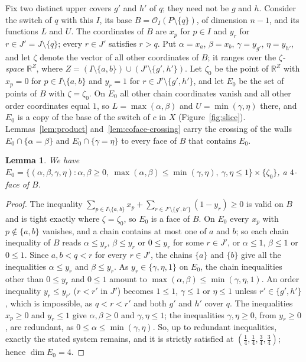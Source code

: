 \documentclass[11pt]{article}
\newtheorem{lemma}[theorem]{Lemma}
\theoremstyle{definition}
\theoremstyle{remark}
\newcommand{\OO}{\mathcal O}
\begin{document}
Fix two distinct upper covers $g'$ and $h'$ of $q$; they need not be $g$ and $h$. Consider the switch of $q$
with this $I$, its base $B=\OO_I(P\setminus\{q\})$, of dimension $n-1$,
and its functions $L$ and $U$. The coordinates of $B$ are $x_p$ for
$p\in I$ and $y_r$ for $r\in J'=J\setminus\{q\}$; every $r\in J'$
satisfies $r>q$. Put $\alpha=x_a$, $\beta=x_b$, $\gamma=y_{g'}$,
$\eta=y_{h'}$, and let $\zeta$ denote the vector of all other
coordinates of $B$; it ranges over the \emph{$\zeta$-space} $\mathbb R^Z$, where
$Z=(I\setminus\{a,b\})\cup(J'\setminus\{g',h'\})$. Let $\zeta_0$ be the point of $\mathbb R^Z$ with $x_p=0$ for
$p\in I\setminus\{a,b\}$ and $y_r=1$ for $r\in J'\setminus\{g',h'\}$,
and let $E_0$ be the set of points of $B$ with $\zeta=\zeta_0$.
On $E_0$ all other chain coordinates vanish and all other order coordinates equal $1$,
so $L=\max(\alpha,\beta)$ and $U=\min(\gamma,\eta)$ there, and $E_0$ is a copy of the base
of the switch of $c$ in $X$ (Figure~\ref{fig:slice}). Lemmas~\ref{lem:product}
and~\ref{lem:coface-crossing} carry the crossing of the walls $E_0\cap\{\alpha=\beta\}$ and $E_0\cap\{\gamma=\eta\}$ to every face of $B$ that contains $E_0$.

\begin{lemma}\label{lem:E0}
We have $E_0=\{(\alpha,\beta,\gamma,\eta):\alpha,\beta\geq0,\
\max(\alpha,\beta)\leq\min(\gamma,\eta),\ \gamma,\eta\leq1\}
\times\{\zeta_0\}$, a $4$-face of $B$.
\end{lemma}
\begin{proof}
The inequality $\sum_{p\in I\setminus\{a,b\}}x_p+\sum_{r\in J'\setminus\{g',h'\}}(1-y_r)\geq0$ is valid on $B$
and is tight exactly where $\zeta=\zeta_0$, so $E_0$ is a face of $B$. On $E_0$ every $x_p$ with $p\notin\{a,b\}$ vanishes, and a chain contains at most one of
$a$ and $b$; so each chain inequality of $B$ reads $\alpha\leq y_r$, $\beta\leq y_r$ or $0\leq y_r$ for some
$r\in J'$, or $\alpha\leq1$, $\beta\leq1$ or $0\leq1$. Since $a,b<q<r$ for every $r\in J'$, the chains $\{a\}$
and $\{b\}$ give all the inequalities $\alpha\leq y_r$ and $\beta\leq y_r$. As $y_r\in\{\gamma,\eta,1\}$ on
$E_0$, the chain inequalities other than $0\leq y_r$ and $0\leq1$ amount to $\max(\alpha,\beta)\leq\min(\gamma,\eta,1)$. An order inequality $y_r\leq y_{r'}$ ($r<r'$
in $J'$) becomes $1\leq1$, $\gamma\leq1$ or $\eta\leq1$ unless
$r'\in\{g',h'\}$, which is impossible, as $q<r<r'$ and both $g'$ and $h'$ cover $q$.
The inequalities $x_p\geq0$ and $y_r\leq1$ give $\alpha,\beta\geq0$ and $\gamma,\eta\leq1$; the inequalities
$\gamma,\eta\geq0$, from $y_r\geq0$, are redundant, as $0\leq\alpha\leq\min(\gamma,\eta)$. So, up to redundant inequalities, exactly the stated system remains, and it is strictly satisfied at $(\frac14,\frac14,\frac34,\frac34)$; hence $\dim E_0=4$.
\end{proof}
\end{document}
